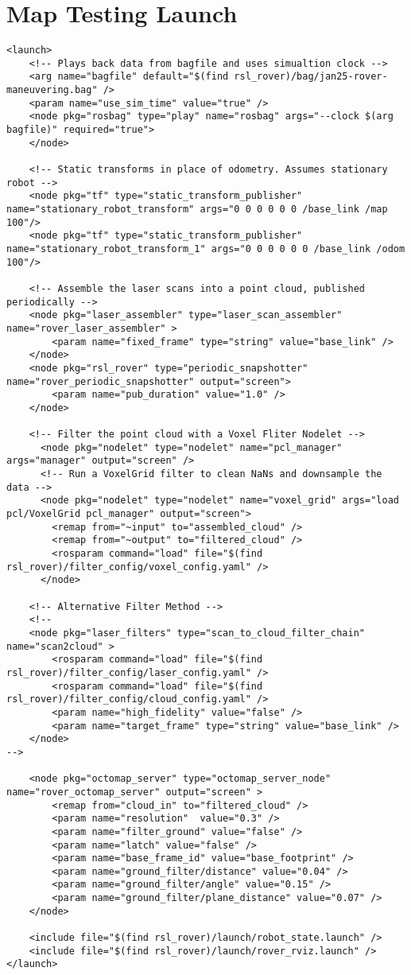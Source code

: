 \section*{Map Testing Launch}
\begin{lstlisting}[breaklines=true,basicstyle=\tiny]
<launch> 
	<!-- Plays back data from bagfile and uses simualtion clock -->
	<arg name="bagfile" default="$(find rsl_rover)/bag/jan25-rover-maneuvering.bag" />
	<param name="use_sim_time" value="true" />
	<node pkg="rosbag" type="play" name="rosbag" args="--clock $(arg bagfile)" required="true">
	</node>

	<!-- Static transforms in place of odometry. Assumes stationary robot -->
	<node pkg="tf" type="static_transform_publisher" name="stationary_robot_transform" args="0 0 0 0 0 0 /base_link /map 100"/>
	<node pkg="tf" type="static_transform_publisher" name="stationary_robot_transform_1" args="0 0 0 0 0 0 /base_link /odom 100"/>

	<!-- Assemble the laser scans into a point cloud, published periodically -->
	<node pkg="laser_assembler" type="laser_scan_assembler" name="rover_laser_assembler" >
		<param name="fixed_frame" type="string" value="base_link" />
	</node>
	<node pkg="rsl_rover" type="periodic_snapshotter" name="rover_periodic_snapshotter" output="screen">
		<param name="pub_duration" value="1.0" />
	</node>

	<!-- Filter the point cloud with a Voxel Fliter Nodelet -->
	  <node pkg="nodelet" type="nodelet" name="pcl_manager" args="manager" output="screen" />
	  <!-- Run a VoxelGrid filter to clean NaNs and downsample the data -->
	  <node pkg="nodelet" type="nodelet" name="voxel_grid" args="load pcl/VoxelGrid pcl_manager" output="screen">
		<remap from="~input" to="assembled_cloud" />
		<remap from="~output" to="filtered_cloud" />
		<rosparam command="load" file="$(find rsl_rover)/filter_config/voxel_config.yaml" />
	  </node>

	<!-- Alternative Filter Method -->
	<!--
	<node pkg="laser_filters" type="scan_to_cloud_filter_chain" name="scan2cloud" >
		<rosparam command="load" file="$(find rsl_rover)/filter_config/laser_config.yaml" />
		<rosparam command="load" file="$(find rsl_rover)/filter_config/cloud_config.yaml" />
		<param name="high_fidelity" value="false" />
		<param name="target_frame" type="string" value="base_link" />
	</node>
-->

	<node pkg="octomap_server" type="octomap_server_node" name="rover_octomap_server" output="screen" >
		<remap from="cloud_in" to="filtered_cloud" />
		<param name="resolution"  value="0.3" />
		<param name="filter_ground" value="false" />
		<param name="latch" value="false" />
		<param name="base_frame_id" value="base_footprint" />
		<param name="ground_filter/distance" value="0.04" />
		<param name="ground_filter/angle" value="0.15" />
		<param name="ground_filter/plane_distance" value="0.07" />
	</node>

	<include file="$(find rsl_rover)/launch/robot_state.launch" />
	<include file="$(find rsl_rover)/launch/rover_rviz.launch" />
</launch>
\end{lstlisting}



